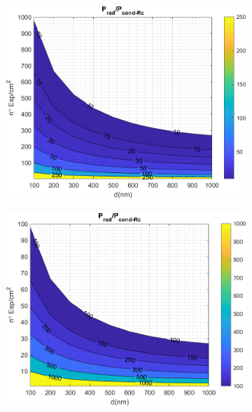 \begin{figure}[H]
	\centering
	\begin{subfigure}[b]{0.49\textwidth}
		\centering
		\includegraphics[width=1.00\textwidth]{figuras/Resultados/RelacionCondRad/SiSi_Rc_full_10.png}
		\caption{ }
		\label{fig:rel_SiSiO2Si_Rc_full_10}
	\end{subfigure}
	\hfill
	\begin{subfigure}[b]{0.49\textwidth}
		\centering
		\includegraphics[width=1.00\textwidth]{figuras/Resultados/RelacionCondRad/SiSi_Rc_full_100.png}
		\caption{ }
		\label{fig:rel_SiSiO2Si_Rc_full_100}
	\end{subfigure}
	\caption{ }
	\label{fig:relation_SiSiO2Si_zoomIn}
\end{figure}

